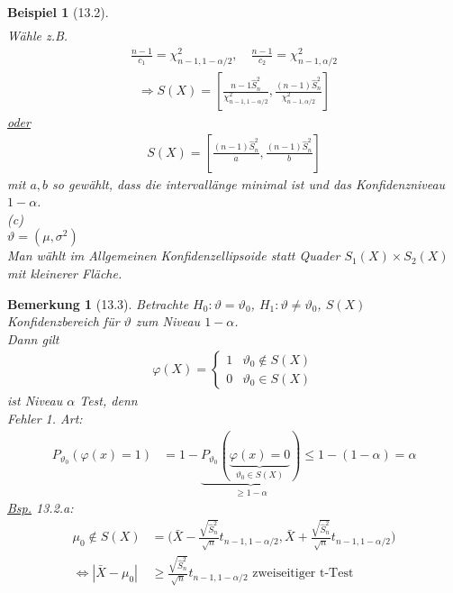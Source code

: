 \documentclass[a4paper,openany]{book}
\theoremstyle{mytheoremstyle}
\newtheorem*{bei}{Beispiel}
\newtheorem*{bem}{Bemerkung}
\theoremstyle{mytheoremstyle2}
\begin{document}
\begin{bei}[13.2]
\begin{align*}
  \end{align*}
  Wähle z.B.
  \begin{align*}
    \frac{n-1}{c_1}=\chi _{n-1,1-\alpha /2}^2,\quad \frac{n-1}{c_2}=\chi _{n-1,\alpha /2}^2
  \end{align*}
  \begin{align*}
    \Rightarrow S(X)=\left[\frac{n-1 \hat{S}_n^2}{\chi _{n-1,1-\alpha /2}^2},\frac{(n-1)\hat{S}_n^2}{\chi _{n-1,\alpha /2}^2}\right]
  \end{align*}
  \underline{oder}
  \begin{align*}
    S(X)=\left[\frac{(n-1)\hat{S}_n^2}{a},\frac{(n-1)\hat{S}_n^2}{b}\right]
  \end{align*}
  mit $a,b  $ so gewählt, dass die intervallänge minimal ist und das Konfidenzniveau $1-\alpha  $.\\
  (c)\\
  $\vartheta =(\mu ,\sigma ^2)$ \\
  Man wählt im Allgemeinen Konfidenzellipsoide statt Quader $S_1(X)\times S_2(X)$ mit kleinerer Fläche.
\end{bei}
\begin{bem}[13.3]
  Betrachte $H_0:\vartheta =\vartheta _0$, $H_1:\vartheta \neq \vartheta _0$, $S(X)$ Konfidenzbereich für $\vartheta $ zum Niveau $1-\alpha $. \\
  Dann gilt 
  \begin{align*}
    \varphi (X)=\begin{cases}
      1 &\vartheta _0 \notin S(X)\\
      0&\vartheta _0 \in S(X)
    \end{cases}
  \end{align*}
  ist Niveau $\alpha $ Test, denn \\
  Fehler 1. Art:
  \begin{align*}
    P _{\vartheta _0}(\varphi (x)=1)
    &=1-\underbrace{P _{\vartheta _0}(\underbrace{\varphi (x)=0}_{\vartheta_0 \in S(X)})}_{\geq 1-\alpha }\leq 1-(1-\alpha )=\alpha 
  \end{align*}
  \underline{Bsp.} 13.2.a:
  \begin{align*}
    \mu _0 \notin S(X)&=\bigg(\bar{X}-\frac{\sqrt{\hat{S}_n^2}}{\sqrt{n}}t _{n-1,1-\alpha /2},\bar{X}+\frac{\sqrt{\hat{S}_n^2}}{\sqrt{n}}t _{n-1,1-\alpha /2}\bigg)\\
    \Leftrightarrow |\bar{X}-\mu _0|&\geq \frac{\sqrt{\hat{S}_n^2}}{\sqrt{n}}t _{n-1,1-\alpha /2}\text{ zweiseitiger t-Test}
  \end{align*}
\end{bem}
\end{document}
